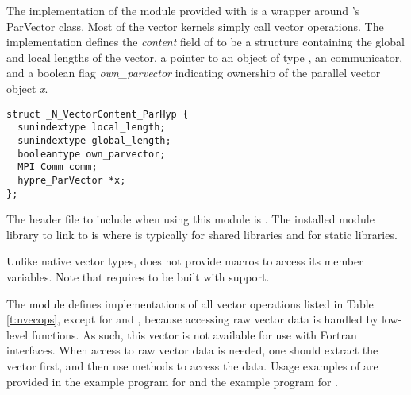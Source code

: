 %
The {\nvecph} implementation of the {\nvector} module provided with
{\sundials} is a wrapper around {\hypre}'s ParVector class. 
Most of the vector kernels simply call {\hypre} vector operations. 
The implementation defines the {\em content} field of  to 
be a structure containing the global and local lengths of the vector, a 
pointer to an object of type , an {\mpi} communicator, 
and a boolean flag {\em own\_parvector} indicating ownership of the
{\hypre} parallel vector object {\em x}.
\begin{verbatim}
struct _N_VectorContent_ParHyp {
  sunindextype local_length;
  sunindextype global_length;
  booleantype own_parvector;
  MPI_Comm comm;
  hypre_ParVector *x;
};
\end{verbatim}
The header file to include when using this module is .
The installed module library to link to is
where  is typically  for shared libraries and 
for static libraries.

Unlike native {\sundials} vector types, {\nvecph} does not provide macros 
to access its member variables.
Note that {\nvecph} requires {\sundials} to be built with {\mpi} support.

The {\nvecph} module defines implementations of all vector operations 
listed in Table \ref{t:nvecops}, except for  and 
, because accessing raw vector data is handled by 
low-level {\hypre} functions. 
As such, this vector is not available for use with {\sundials} Fortran interfaces.
When access to raw vector data is needed, one 
should extract the {\hypre} vector first, and then use {\hypre} 
methods to access the data. Usage examples of {\nvecph} are provided in 
the  example program for {\cvode} \cite{cvode_ex} 
and the  example program for {\arkode} \cite{arkode_ex}.

